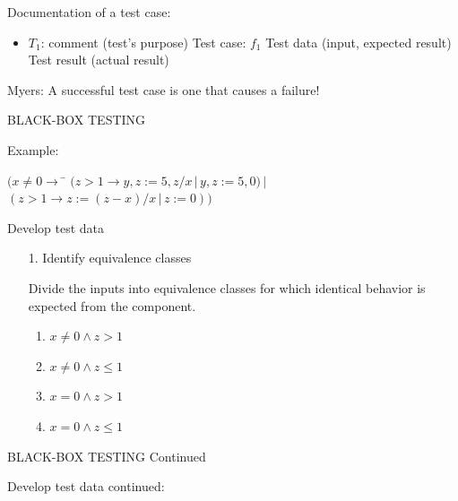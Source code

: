 Documentation of a test case:
\begin{itemize}

\item $T_1$: comment (test's purpose)
\subitem Test case: $f_1$
\subitem Test data (input, expected result)
\subitem Test result (actual result)

\end{itemize}

Myers: A successful test case is one that causes a failure!


\newpage
\centerline{BLACK-BOX TESTING}

\bigskip


Example:
\begin{tabbing}
$ (x \ne 0 \rightarrow $ \= $( z > 1 \rightarrow y, z := 5, z/x \,|\, y, z := 5,0) \,|\,$ \\
                         \> $( z > 1 \rightarrow z := (z-x) / x \,|\, z := 0))$ \\
\end{tabbing}

Develop test data

\begin{enumerate}

\item[1.] Identify equivalence classes

Divide the inputs into equivalence classes for which
identical behavior is expected from the component.
\begin{enumerate}
\item $x \ne 0 \wedge z >    1$
\item $x \ne 0 \wedge z \leq 1$
\item $x  =  0 \wedge z >    1$
\item $x  =  0 \wedge z \leq 1$
\end{enumerate}

\end{enumerate}

\newpage
\centerline{BLACK-BOX TESTING Continued}

\bigskip

Develop test data continued:

